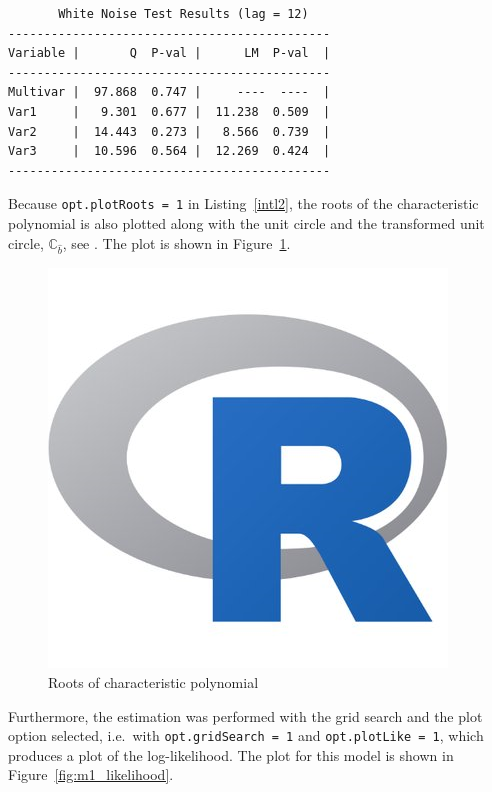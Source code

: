 \documentclass[10pt]{article}
\begin{document}
\begin{verbatim}
       White Noise Test Results (lag = 12)
---------------------------------------------
Variable |       Q  P-val |      LM  P-val  |
---------------------------------------------
Multivar |  97.868  0.747 |     ----  ----  |
Var1     |   9.301  0.677 |  11.238  0.509  |
Var2     |  14.443  0.273 |   8.566  0.739  |
Var3     |  10.596  0.564 |  12.269  0.424  |
---------------------------------------------
\end{verbatim}

Because \verb|opt.plotRoots = 1| in Listing~\ref{intl2}, the roots of the characteristic polynomial is also plotted along with the unit circle and the transformed unit circle, $\mathbb{C}_{\hat{b}}$, see \cite{Johansen2008}. The plot is shown in Figure~\ref{fig:Roots}.

\begin{figure}[H]
  \centering
  \caption{Roots of characteristic polynomial}
  \label{fig:Roots}
  \includegraphics[scale = .6, keepaspectratio=true]{roots.png}
\end{figure}

Furthermore, the estimation was performed with the grid search and the plot option selected, i.e.\ with \verb|opt.gridSearch = 1| and \verb|opt.plotLike = 1|, which produces a plot of the log-likelihood. The plot for this model is shown in Figure~\ref{fig:m1_likelihood}.
\end{document}
